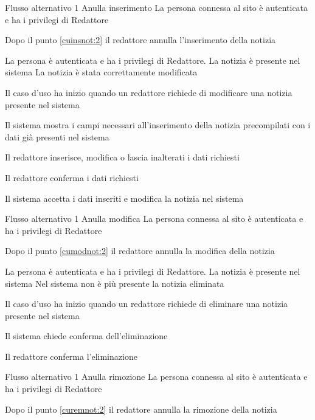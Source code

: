 %
{Flusso alternativo 1}%
{Anulla inserimento}%
{La persona connessa al sito è autenticata e ha i privilegi di Redattore}%
{\postNulle}%
{\begin{enumCU}
		\item Dopo il punto \ref{cuinsnot:2} il redattore annulla l'inserimento della notizia
	\end{enumCU}}%

\tabcuvspace

{}
{La persona è autenticata e ha i privilegi di Redattore. La notizia è presente nel sistema}
{La notizia è stata correttamente modificata}
{\begin{enumCU}
	\item Il caso d'uso ha inizio quando un redattore richiede di modificare una notizia presente nel sistema 
	\item Il sistema mostra i campi necessari all'inserimento della notizia precompilati con i dati già presenti nel sistema
	\item Il redattore inserisce, modifica o lascia inalterati i dati richiesti \label{cumodnot:2}
	\item Il redattore conferma i dati richiesti
	\item Il sistema accetta i dati inseriti e modifica la notizia nel sistema
\end{enumCU}}
%
{Flusso alternativo 1}%
{Anulla modifica}%
{La persona connessa al sito è autenticata e ha i privilegi di Redattore}%
{\postNulle}%
{\begin{enumCU}
		\item Dopo il punto \ref{cumodnot:2} il redattore annulla la modifica della notizia
	\end{enumCU}}%

\tabcuvspace

{}
{La persona è autenticata e ha i privilegi di Redattore. La notizia è presente nel sistema}
{Nel sistema non è più presente la notizia eliminata}
{\begin{enumCU}
	\item Il caso d'uso ha inizio quando un redattore richiede di eliminare una notizia presente nel sistema
	\item Il sistema chiede conferma dell'eliminazione \label{curemnot:2}
	\item Il redattore conferma l'eliminazione
\end{enumCU}}
%
{Flusso alternativo 1}%
{Anulla rimozione}%
{La persona connessa al sito è autenticata e ha i privilegi di Redattore}%
{\postNulle}%
{\begin{enumCU}
		\item Dopo il punto \ref{curemnot:2} il redattore annulla la rimozione della notizia
	\end{enumCU}}%


